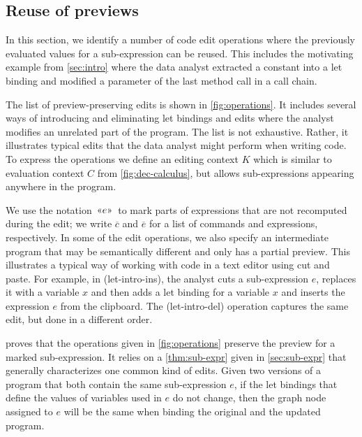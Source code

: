 \documentclass[english,crc,references=cleveref]{programming}
\theoremstyle{plain}
\theoremstyle{definition}
\newcommand{\rname}[1]{{\sffamily(#1)}}
\newcommand{\preview}[1]{\,\textnormal{\guillemotleft} #1\textnormal{\guillemotright}\,}
\begin{document}

\subsection{Reuse of previews}
\label{sec:evaluation-reuse}

In this section, we identify a number of code edit operations where the previously evaluated
values for a sub-expression can be reused. This includes the motivating example from
\cref{sec:intro} where the data analyst extracted a constant into a let binding and
modified a parameter of the last method call in a call chain.

The list of preview-preserving edits is shown in \cref{fig:operations}.
It includes several ways of introducing and eliminating let bindings and edits where the analyst
modifies an unrelated part of the program. The list is not exhaustive. Rather, it illustrates
typical edits that the data analyst might perform when writing code. To express the operations we
define an editing context $K$ which is similar to evaluation context $C$ from \cref{fig:dec-calculus},
but allows sub-expressions appearing anywhere in the program.

We use the notation $\preview{e}$ to mark parts of expressions that are not recomputed
during the edit; we write $\overline{c}$ and $\overline{e}$ for a list of commands and expressions,
respectively. In some of the edit operations, we also specify an intermediate program that may be
semantically different and only has a partial preview. This illustrates a typical way of
working with code in a text editor using cut and paste. For example, in
\rname{let-intro-ins}, the analyst cuts a sub-expression $e$, replaces it with
a variable $x$ and then adds a let binding for a variable $x$ and inserts the expression $e$
from the clipboard. The \rname{let-intro-del} operation captures the same edit, but
done in a different order.

 proves that the operations given in \cref{fig:operations}
preserve the preview for a marked sub-expression. It relies on a \cref{thm:sub-expr} given in
\cref{sec:sub-expr} that generally characterizes one common kind of edits. Given two versions
of a program that both contain the same sub-expression $e$, if the let bindings that define the values of
variables used in $e$ do not change, then the graph node assigned to $e$ will be the same
when binding the original and the updated program.
\end{document}
